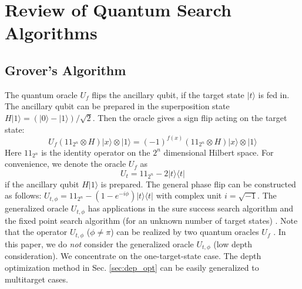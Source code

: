 \documentclass[%
 twocolumn,
 10pt,
 superscriptaddress,
 longbibliography,
 amsmath,amssymb,
 aps,
 pra,
floatfix,
]{revtex4-1}
\begin{document}
\section{\label{sec:Grover}Review of Quantum Search Algorithms}

\subsection{\label{subsec:Grover}Grover's Algorithm} 

The quantum oracle $U_f$ flips the ancillary qubit, if the target state $|t\rangle$ is fed in. The ancillary qubit can be prepared in the superposition state $H|1\rangle = (|0\rangle-|1\rangle)/\sqrt 2$. Then the oracle gives a sign flip acting on the target state:
\begin{equation}
U_f(1\!\!1_{2^n}\otimes H)|x\rangle\otimes|1\rangle = (-1)^{f(x)}(1\!\!1_{2^n}\otimes H)|x\rangle\otimes|1\rangle
\end{equation}
Here $1\!\!1_{2^n}$ is the identity operator on the $2^n$ dimensional Hilbert space. For convenience, we denote the oracle $U_f$ as
\begin{equation}
\label{def U t}
U_t=1\!\!1_{2^n}-2|t\rangle\langle t|  
\end{equation}
if the ancillary qubit $H|1\rangle$ is prepared. The general phase flip can be constructed as follows: $U_{t,\phi}=1\!\!1_{2^n}-(1-e^{-i\phi})|t\rangle\langle t|$ with complex unit $i=\sqrt{-1}$. The generalized oracle $U_{t,\phi}$ has applications in the sure success search algorithm \cite{BHMT00,MTB18} and the fixed point search algorithm (for an unknown number of target states) \cite{YLC14}. Note that the operator $U_{t,\phi}$ ($\phi\neq \pi$) can be realized by two quantum oracles $U_f$ \cite{YLC14}. In this paper, we do \textit{not} consider the generalized oracle $U_{t,\phi}$ (low depth consideration). We concentrate on the one-target-state case. The depth optimization method in Sec. \ref{sec:dep_opt} can be easily generalized to multitarget cases.
\end{document}
